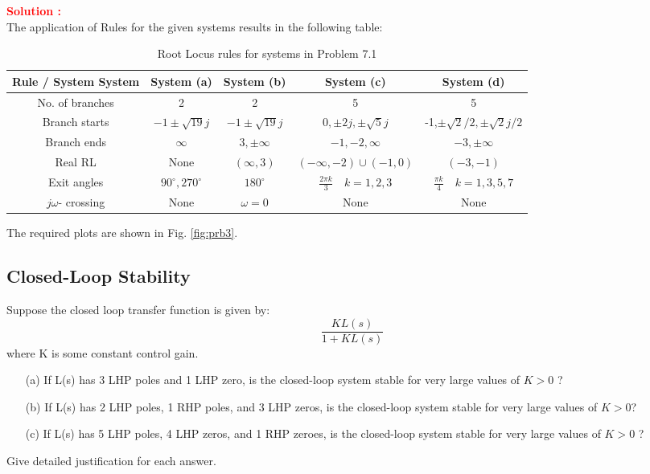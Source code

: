 \documentclass[12pt]{article}
\begin{document}
\textbf{\textcolor{red}{Solution :}} \\
The application of Rules for the given systems results in the following table: \\
\begin{table}[H]
    \centering
    \begin{tabular}{|c|c|c|c|c|}
    \hline
       Rule / System System   &  System (a) & System (b) & System (c) & System (d) \\
       \hline
        No. of branches & 2 & 2& 5 & 5 \\
       \hline
        Branch starts & $-1 \pm \sqrt{19}j $ & $-1 \pm \sqrt{19}j $ & $ 0,\pm 2j, \pm \sqrt{5}j $ &  -1,$\pm\sqrt{2}/2, \pm\sqrt{2}j/2 $ \\
       \hline
        Branch ends & $\infty$ & $ 3, \pm \infty $ & $-1,-2, \infty $  & $-3, \pm \infty $ \\
       \hline
        Real RL & None & $\left(\infty, 3 \right)$ & $\left(-\infty,-2 \right) \cup \left(-1,0 \right)$ & $\left( -3, -1 \right) $  \\
       \hline
        Exit angles  & $90^\circ ,  270^\circ $ &  $ 180^\circ $ & $\frac{2 \pi k}{3} \quad k=1,2,3$ & $\frac{\pi k}{4 } \quad k=1,3,5,7$ \\
        \hline
        $j \omega$- crossing & None & $\omega=0$ & None & None \\
        \hline
    \end{tabular}
    \caption{Root Locus rules for systems in Problem 7.1}
    \label{tab:prb3}
\end{table}
The required plots are shown in Fig. \ref{fig:prb3}.
\clearpage

\subsection{Closed-Loop Stability} 

Suppose the closed loop transfer function is given by:
\[
\frac{K L(s)}{1+ K L(s)}
\]
where K is some constant control gain.
\begin{itemize}
    \item [(a)] If L(s) has 3 LHP poles and 1 LHP zero, is the closed-loop system stable for very large values of $K > 0$ ?
    \item [(b)] If L(s) has 2 LHP poles, 1 RHP poles, and 3 LHP zeros, is the closed-loop system stable for very large values of $K > 0$?
    \item [(c)] If L(s) has 5 LHP poles, 4 LHP zeros, and 1 RHP zeroes, is the closed-loop system stable for very large values of $K > 0$ ?
\end{itemize}
Give detailed justification for each answer. \\
\end{document}
